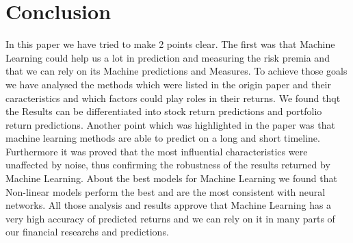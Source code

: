 \section{Conclusion}

In this paper we have tried to make 2 points clear. The first was that Machine Learning could help us
 a lot in prediction and measuring the risk premia 
and that we can rely on its Machine predictions and Measures. 
To achieve those goals we have analysed the methods which were listed in the origin paper and their caracteristics
and which factors could play roles in their returns.
We found thqt the Results can be differentiated into stock return predictions and portfolio return predictions.
Another point which was highlighted in the paper was that machine learning methods are able to predict on a long and short timeline.
Furthermore it was proved that the most influential characteristics were unaffected by noise, thus confirming the
robustness of the results returned by Machine Learning.
About the best models for Machine Learning we found that Non-linear models perform the best and are the most consistent with neural networks.
All those analysis and results approve that Machine Learning has a very high accuracy of predicted returns and we can rely on it
in many parts of our financial researchs and predictions.